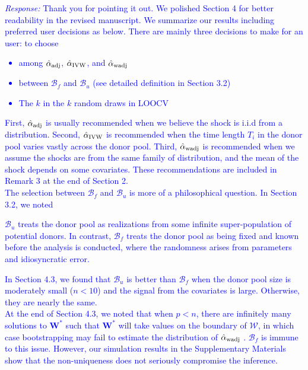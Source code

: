 \documentclass[12pt]{article}
\newcommand{\response}[1]{\noindent \textcolor{blue}{\emph{Response:} #1}}
\begin{document}
{\response{Thank you for pointing it out. We polished Section 4 for better readability in the revised manuscript. We  summarize  our results including preferred user decisions as below. There are mainly three decisions to make for an user: to choose 
  \begin{itemize}
    \item among  $\hat{\alpha}_{\rm adj}$, $\hat{\alpha}_{\rm IVW}$, and $\hat{\alpha}_{\rm wadj}$ 
    \item between $\mathcal{B}_f$ and $\mathcal{B}_u$ (see detailed definition in Section 3.2)
    \item The $k$ in the $k$ random draws in LOOCV
  \end{itemize}
  First, $\hat{\alpha}_{\rm adj}$ is usually recommended when we believe the shock is i.i.d from a distribution. Second, $\hat{\alpha}_{\rm IVW}$ is recommended when the time length $T_i$ in the donor pool varies vastly across the donor pool. Third, $\hat{\alpha}_{\rm wadj}$  is recommended when we assume the shocks are from the same family of distribution, and the mean of the shock depends on some covariates. These recommendations are included in Remark 3 at the end of Section 2. \\
  
  The selection between $\mathcal{B}_f$ and $\mathcal{B}_u$ is more of a philosophical question. In Section 3.2,  we noted
  
  \begin{tcolorbox}
  $\mathcal{B}_u$ treats the donor pool as realizations from some infinite super-population of potential donors. In contrast, $\mathcal{B}_f$ treats the donor pool as being fixed  and known before the analysis is conducted, where the randomness arises from parameters and idiosyncratic error.   
  \end{tcolorbox}

In Section 4.3, we found that $\mathcal{B}_u$ is better than $\mathcal{B}_f$ when  the donor pool size is moderately small ($n< 10$) and the signal from the covariates is large. Otherwise, they are nearly the same. \\


At the end of Section 4.3, we noted that when $p < n$, there are infinitely many solutions to $\mathbf{W}^*$ such that $\mathbf{W}^*$ will take values on the boundary of $\mathcal{W}$, in which case bootstrapping may fail to estimate the distribution of $\hat{\alpha}_{\rm wadj}$ \citep{andrews2000inconsistency}. $\mathcal{B}_f$  is immune to this issue. However, our simulation results in the Supplementary Materials show that the non-uniqueness does not seriously compromise the inference. \\



}}
\end{document}
